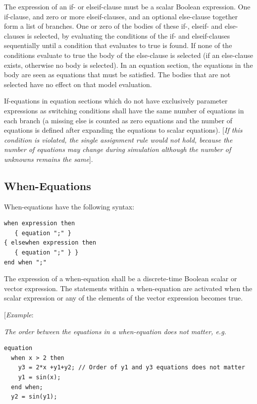 \documentclass[10pt,a4paper]{report}
\def\doublelabel#1{\label{#1}}
\begin{document}
The expression of an if- or elseif-clause must be a scalar Boolean
expression. One if-clause, and zero or more elseif-clauses, and an
optional else-clause together form a list of branches. One or zero of
the bodies of these if-, elseif- and else-clauses is selected, by
evaluating the conditions of the if- and elseif-clauses sequentially
until a condition that evaluates to true is found. If none of the
conditions evaluate to true the body of the else-clause is selected (if
an else-clause exists, otherwise no body is selected). In an equation
section, the equations in the body are seen as equations that must be
satisfied. The bodies that are not selected have no effect on that model
evaluation.

If-equations in equation sections which do not have exclusively
parameter expressions as switching conditions shall have the same number
of equations in each branch (a missing else is counted as zero equations
and the number of equations is defined after expanding the equations to
scalar equations). {[}\emph{If this condition is violated, the single
assignment rule would not hold, because the number of equations may
change during simulation although the number of unknowns remains the
same}{]}.

\subsection{When-Equations}\doublelabel{when-equations}

When-equations have the following syntax:
\begin{lstlisting}[language=grammar]
when expression then 
   { equation ";" }   
{ elsewhen expression then     
   { equation ";" } }   
end when ";" 
\end{lstlisting}

The expression of a when-equation shall be a discrete-time Boolean
scalar or vector expression. The statements within a when-equation are
activated when the scalar expression or any of the elements of the
vector expression becomes true.

{[}\emph{Example}:

\emph{The order between the equations in a when-equation does not
matter, e.g.}

\begin{lstlisting}[language=modelica]
equation   
  when x > 2 then
    y3 = 2*x +y1+y2; // Order of y1 and y3 equations does not matter     
    y1 = sin(x);     
  end when;   
  y2 = sin(y1);
\end{lstlisting}
\end{document}
